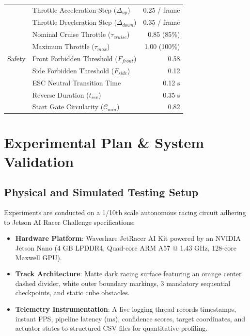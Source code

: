 \documentclass[conference]{IEEEtran}
\begin{document}
\begin{table}[htbp]
{\begin{tabular}{llr}
                               & Throttle Acceleration Step ($\Delta_{up}$)     & 0.25 / frame     \\
                               & Throttle Deceleration Step ($\Delta_{down}$)   & 0.35 / frame     \\
                               & Nominal Cruise Throttle ($\tau_{cruise}$)      & 0.85 (85\%)      \\
                               & Maximum Throttle ($\tau_{max}$)                & 1.00 (100\%)     \\
            \midrule
            Safety             & Front Forbidden Threshold ($F_{front}$)        & 0.58             \\
                               & Side Forbidden Threshold ($F_{side}$)          & 0.12             \\
                               & ESC Neutral Transition Time                    & 0.12 s           \\
                               & Reverse Duration ($t_{rev}$)                   & 0.35 s           \\
                               & Start Gate Circularity ($\mathcal{C}_{min}$)   & 0.82             \\
            \bottomrule
        \end{tabular}%
    }
\end{table}

\section{Experimental Plan \& System Validation}

\subsection{Physical and Simulated Testing Setup}
Experiments are conducted on a 1/10th scale autonomous racing circuit adhering to Jetson AI Racer Challenge specifications:
\begin{itemize}
    \item \textbf{Hardware Platform}: Waveshare JetRacer AI Kit powered by an NVIDIA Jetson Nano (4 GB LPDDR4, Quad-core ARM A57 @ 1.43 GHz, 128-core Maxwell GPU).
    \item \textbf{Track Architecture}: Matte dark racing surface featuring an orange center dashed divider, white outer boundary markings, 3 mandatory sequential checkpoints, and static cube obstacles.
    \item \textbf{Telemetry Instrumentation}: A live logging thread records timestamps, instant FPS, pipeline latency (ms), confidence scores, target coordinates, and actuator states to structured CSV files for quantitative profiling.
\end{itemize}
\end{document}
